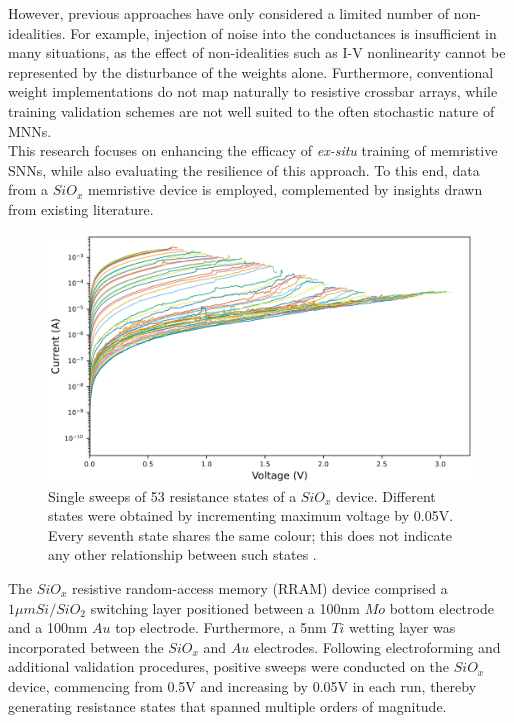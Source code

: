 \noindent However, previous approaches have only considered a limited number of non-idealities. For example, injection of noise into the conductances is insufficient in many situations, as the effect of non-idealities such as I-V nonlinearity cannot be represented by the disturbance of the weights alone. Furthermore, conventional weight implementations do not map naturally to resistive crossbar arrays, while training validation schemes are not well suited to the often stochastic nature of MNNs.\\

\noindent This research focuses on enhancing the efficacy of \textit{ex-situ} training of memristive SNNs, while also evaluating the resilience of this approach. To this end, data from a $SiO_x$ memristive device is employed, complemented by insights drawn from existing literature.\\

\begin{figure}[htbp!] 
\centering    
\includegraphics[width=1\textwidth]{Chapter6/Figs/g.png}
\caption[Single sweeps of 53 resistance states of a $SiO_x$ device.]{Single sweeps of 53 resistance states of a $SiO_x$ device. Different states were obtained by incrementing maximum voltage by 0.05V. Every seventh state shares the same colour; this does not indicate any other relationship between such states \cite{nikolaos_barmpatsalos_2021_5762184}.}
\label{fig:6g}
\end{figure}


\noindent The $SiO_x$ resistive random-access memory (RRAM) device comprised a $1 \mu m Si/SiO_2$  switching layer positioned between a 100nm $Mo$ bottom electrode and a 100nm $Au$ top electrode. Furthermore, a 5nm $Ti$ wetting layer was incorporated between the $SiO_x$ and $Au$ electrodes. Following electroforming and additional validation procedures, positive sweeps were conducted on the $SiO_x$ device, commencing from 0.5V and increasing by 0.05V in each run, thereby generating resistance states that spanned multiple orders of magnitude.\\


